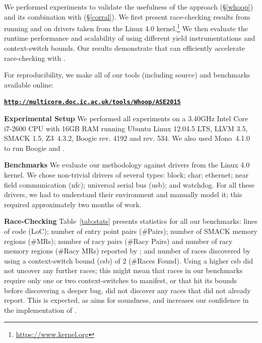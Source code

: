We performed experiments to validate the usefulness of the \whoop approach (\S\ref{whoop}) and its combination with \corral (\S\ref{corral}). We first present race-checking results from running \whoop and \corral on \sizeOfBenchmarks drivers taken from the Linux 4.0 kernel.\footnote{\url{https://www.kernel.org}} We then evaluate the runtime performance and scalability of \corral using different yield instrumentations and context-switch bounds. Our results demonstrate that \whoop can efficiently accelerate race-checking with \corral.

For reproducibility, we make all of our tools (including source) and benchmarks available online:

\begin{scriptsize}
\textbf{\texttt{\url{http://multicore.doc.ic.ac.uk/tools/Whoop/ASE2015}}}
\end{scriptsize}

\noindent\textbf{Experimental Setup }
%
We performed all experiments on a 3.40GHz Intel Core i7-2600 CPU with 16GB RAM running Ubuntu Linux 12.04.5 LTS, LLVM 3.5, SMACK 1.5, Z3~4.3.2, Boogie rev. 4192 and \corral rev. 534. We also used Mono~4.1.0 to run Boogie and \corral.

\noindent\textbf{Benchmarks }
%
We evaluate our methodology against \sizeOfBenchmarks drivers from the Linux 4.0 kernel. We chose non-trivial drivers of several types: block; char; ethernet; near field communication (nfc); universal serial bus (usb); and watchdog. For all these drivers, we had to understand their environment and manually model it; this required approximately two months of work.

\noindent\textbf{Race-Checking }
%
Table~\ref{tab:stats} presents statistics for all our benchmarks: lines of code (LoC); number of entry point pairs (\#Pairs); number of SMACK memory regions (\#MRs); number of racy pairs (\#Racy Pairs) and number of racy memory regions (\#Racy MRs) reported by \whoop; and number of races discovered by \corral using a context-switch bound (csb) of 2 (\#Races Found). Using a higher csb did not uncover any further races; this might mean that races in our benchmarks require only one or two context-switches to manifest, or that \corral hit its bounds before discovering a deeper bug. \corral did not discover any races that \whoop did not already report.  This is expected, as \whoop aims for soundness, and increases our confidence in the implementation of \whoop.

